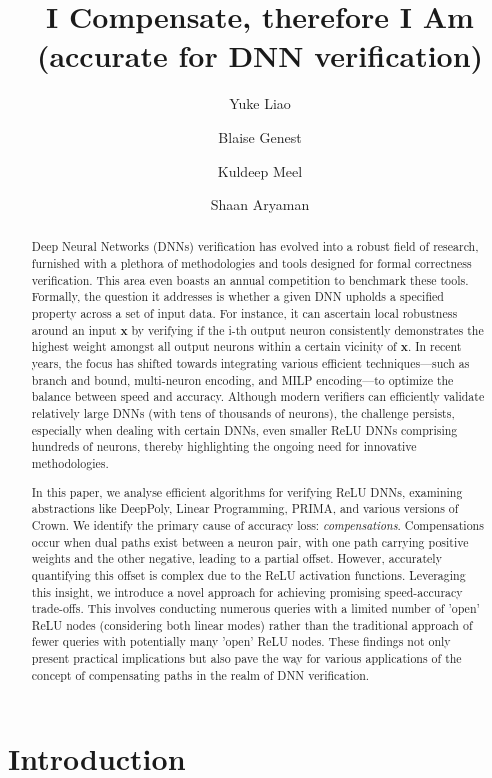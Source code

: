 \documentclass[a4paper,UKenglish,cleveref, autoref, thm-restate]{lipics-v2021}
\title{I Compensate, therefore I Am \\ (accurate for DNN verification)}
\date{}
\author{Yuke Liao}{CNRS@CREATE, Singapore}{yuke.liao@cnrsatcreate.sg}{}{}
\author{Blaise Genest}{CNRS, France \and CNRS@CREATE, Singapore \and https://perso.crans.org/genest/}{blaise.genest@cnrsatcreate.sg}{}{}
\author{Kuldeep Meel}{University of Toronto, Canada \and https://www.cs.toronto.edu/~meel/}{ meel@cs.toronto.edu}{}{}
\author{Shaan Aryaman}{NYU Courant Institute of Mathematical Sciences, United States}{aryaman.shaan@gmail.com}{}{}
\newcommand{\vx}{\boldsymbol{x}}
\begin{document}
	
	\maketitle
	
	\begin{abstract}
		
		Deep Neural Networks (DNNs) verification has evolved into a robust field of research, furnished with a plethora of methodologies and tools designed for formal correctness verification. This area even boasts an annual competition to benchmark these tools. Formally, the question it addresses is whether a given DNN upholds a specified property across a set of input data. For instance, it can ascertain local robustness around an input $\vx$ by verifying if the i-th output neuron consistently demonstrates the highest weight amongst all output neurons within a certain vicinity of $\vx$. In recent years, the focus has shifted towards integrating various efficient techniques—such as branch and bound, multi-neuron encoding, and MILP encoding—to optimize the balance between speed and accuracy. Although modern verifiers can efficiently validate relatively large DNNs (with tens of thousands of neurons), the challenge persists, especially when dealing with certain DNNs, even smaller ReLU DNNs comprising hundreds of neurons, thereby highlighting the ongoing need for innovative methodologies.
		
		In this paper, we analyse efficient algorithms  for verifying ReLU DNNs, examining abstractions like DeepPoly, Linear Programming, PRIMA, and various versions of Crown. We identify the primary cause of accuracy loss: {\em compensations}. Compensations occur when dual paths exist between a neuron pair, with one path carrying positive weights and the other negative, leading to a partial offset. However, accurately quantifying this offset is complex due to the ReLU activation functions. Leveraging this insight, we introduce a novel approach for achieving promising speed-accuracy trade-offs. This involves conducting numerous queries with a limited number of 'open' ReLU nodes (considering both linear modes) rather than the traditional approach of fewer queries with potentially many 'open' ReLU nodes. These findings not only present practical implications but also pave the way for various applications of the concept of compensating paths in the realm of DNN verification.
		
		
	\end{abstract}
	
	
	\section{Introduction}
	
\end{document}
